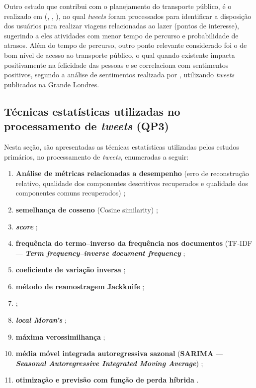 \documentclass[
	12pt,				%
	oneside,			%
	a4paper,			%
	english,			%
	brazil				%
	]{abntex2ppgsi}
\begin{document}
{{Outro estudo que contribui com o planejamento do transporte público, é o realizado em (\citeauthor{Gkiotsalitis2015}, \citeyear{Gkiotsalitis2015}, \citeyear{Gkiotsalitis2016}), no qual \textit{tweets} foram processados para identificar a disposição dos usuários para realizar viagens relacionadas ao lazer (pontos de interesse), sugerindo a eles atividades com menor tempo de percurso e probabilidade de atrasos. Além do tempo de percurso, outro ponto relevante considerado foi o de bom nível de acesso ao transporte público, o qual quando existente impacta positivamente na felicidade das pessoas e se correlaciona com sentimentos positivos, segundo a análise de sentimentos realizada por \cite{Guo2016}, utilizando \textit{tweets} publicados na Grande Londres.

\subsection{Técnicas estatísticas utilizadas no processamento de \textit{tweets} (QP3)}
Nesta seção, são apresentadas as técnicas estatísticas utilizadas pelos estudos primários, no processamento de \textit{tweets}, enumeradas a seguir:

\begin{enumerate}
\item \textbf{Análise de métricas relacionadas a desempenho} (erro de reconstrução relativo, qualidade dos componentes descritivos recuperados e qualidade dos componentes comuns recuperados) \cite{Wen2016};
\item \textbf{semelhança de cosseno} (Cosine similarity) \cite{Yousaf2014, Frias-Martinez2014};
\item \textbf{\textit{ score}} \cite{Anantharam2015, Chen2016};
\item \textbf{frequência do termo–inverso da frequência nos documentos} (TF-IDF --- \textit{\textbf{Term frequency–inverse document frequency}} \cite{Mukherjee2015};
\item \textbf{coeficiente de variação inversa} \cite{Bendler2014};
\item \textbf{método de reamostragem Jackknife} \cite{Bendler2014};
\item {} \cite{Steiger2015Census};
\item \textit{\textbf{local Moran's}} \cite{Steiger2015Census};
\item \textbf{máxima verossimilhança} \cite{Mukherjee2015};
\item {} \textbf{média móvel integrada autoregressiva sazonal} (\textbf{SARIMA} --- {\textit{\textbf{Seasonal Autoregressive Integrated Moving Average}})} \cite{Ni2016};
\item \textbf{otimização e previsão com função de perda híbrida} \cite{Ni2016}.
\end{enumerate}
 
}}
\end{document}
